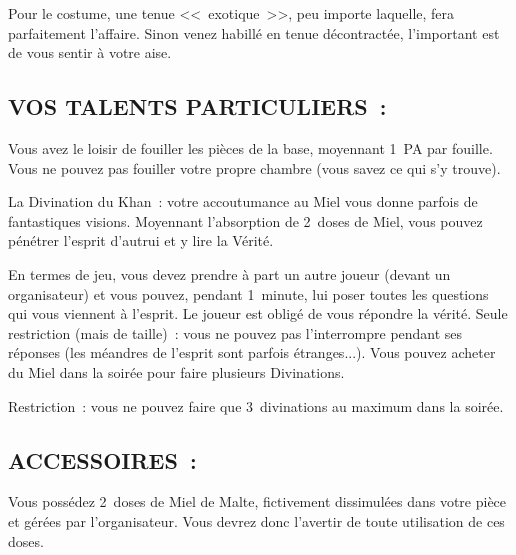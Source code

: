 \documentclass[14pt,twocolumn]{extarticle}
\begin{document}
Pour le costume, une tenue <<~exotique~>>, peu importe laquelle, fera
parfaitement l'affaire. Sinon venez habillé en tenue décontractée, l'important
est de vous sentir à votre aise.


\subsection{VOS TALENTS PARTICULIERS~:}

Vous avez le loisir de fouiller les pièces de la base, moyennant 1~PA par
fouille. Vous ne pouvez pas fouiller votre propre chambre (vous savez ce qui
s'y trouve).

La Divination du Khan~: votre accoutumance au Miel vous donne parfois de
fantastiques visions. Moyennant l'absorption de 2~doses de Miel, vous pouvez
pénétrer l'esprit d'autrui et y lire la Vérité.

En termes de jeu, vous devez prendre à part un autre joueur (devant un
organisateur) et vous pouvez, pendant 1~minute, lui poser toutes les questions
qui vous viennent à l'esprit. Le joueur est obligé de vous répondre la vérité.
Seule restriction (mais de taille)~: vous ne pouvez pas l'interrompre pendant
ses réponses (les méandres de l'esprit sont parfois étranges...). Vous pouvez
acheter du Miel dans la soirée pour faire plusieurs Divinations.

Restriction~: vous ne pouvez faire que 3~divinations au maximum dans la
soirée.

\subsection{ACCESSOIRES~:}

Vous possédez 2~doses de Miel de Malte, fictivement dissimulées dans votre
pièce et gérées par l'organisateur. Vous devrez donc l'avertir de toute
utilisation de ces doses.
\end{document}
